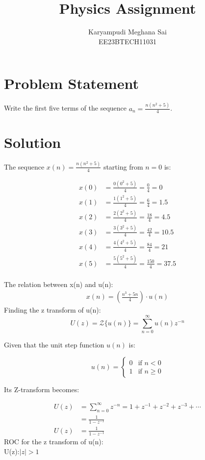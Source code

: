 \documentclass{article}
\begin{document}
\title{Physics Assignment}
\author{Karyampudi Meghana Sai\\ EE23BTECH11031}
\maketitle

\section*{Problem Statement}
Write the first five terms of the sequence \(a_n = \frac{n(n^2+5)}{4}\).

\section*{Solution}
The sequence \(x(n) = \frac{n(n^2+5)}{4}\) starting from \(n = 0\) is:

\begin{align*}
x(0) &= \frac{0(0^2+5)}{4} = \frac{0}{4} = 0 \\
x(1) &= \frac{1(1^2+5)}{4} = \frac{6}{4} = 1.5 \\
x(2) &= \frac{2(2^2+5)}{4} = \frac{18}{4} = 4.5 \\
x(3) &= \frac{3(3^2+5)}{4} = \frac{42}{4} = 10.5 \\
x(4) &= \frac{4(4^2+5)}{4} = \frac{84}{4} = 21 \\
x(5) &= \frac{5(5^2+5)}{4} = \frac{150}{4} = 37.5 \\
\end{align*}


The relation between x(n) and u(n):
\begin{align}
 x(n) = \left(\frac{n^3+5n}{4}\right) \cdot u(n)
 \end{align}
Finding the z transform of u(n):
\[
U(z) = \mathcal{Z}\{u(n)\} = \sum_{n=0}^{\infty} u(n)z^{-n}
\]

Given that the unit step function \(u(n)\) is:

\[ u(n) = \begin{cases} 0 & \text{if } n < 0 \\ 1 & \text{if } n \geq 0 \end{cases} \]

Its Z-transform becomes:

\begin{align}
U(z) &= \sum_{n=0}^{\infty} z^{-n} = 1 + z^{-1} + z^{-2} + z^{-3} + \dotsb \nonumber \\
&= \frac{1}{1 - z^{-1}} \nonumber \\
U(z) &= \frac{1}{1- z^{-1}}
\end{align}
ROC for the z transform of u(n):\\
 U(z):$\lvert z \rvert > 1$
\end{document}
